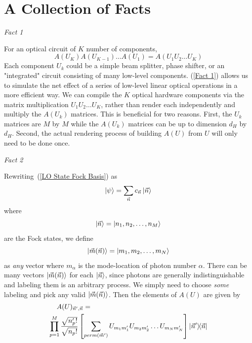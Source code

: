 \documentclass[aps,pra,twocolumn,showpacs,superscriptaddress,floatfix,10pt]{revtex4}
\begin{document}
\section{A Collection of Facts}
\label{Section of Facts}
\begin{center}\textit{Fact 1} \end{center}
For an optical circuit of $K$ number of components,
\begin{equation}
	\label{Fact 1}
\boxed{A(U_K) A(U_{K-1}) \dots A(U_1) = A(U_1 U_2 \dots U_K)}
\end{equation}
Each component $U_k$ could be a simple beam splitter, phase shifter, or an "integrated" circuit consisting of many low-level components.
(\ref{Fact 1}) allows us to simulate the net effect of a series of low-level linear optical operations  in a more efficient way. We can compile the $K$ optical hardware components via the matrix multiplication $U_1 U_2 \dots U_K$, rather than render each independently and multiply the $A(U_k)$ matrices. This is beneficial for two reasons. First, the $U_k$ matrices are $M$ by $M$ while the $A(U_k)$ matrices can be up to dimension $d_H$ by $d_H$. Second, the actual rendering process of building $A(U)$ from $U$ will only need to be done once.
\begin{center}\textit{Fact 2} \end{center}
Rewriting~(\ref{LO State Fock Basis}) as
\begin{equation}
\label{LO State Fock Vec Basis}
\ket{\psi} = \sum_{\vec{n}} c_{\vec{n}} \ket{\vec{n}}
\end{equation}
where
\begin{equation}
\ket{\vec{n}} = \ket{n_1,n_2,\dots,n_M}
\end{equation}
are the Fock states, we define
\begin{equation}
\label{m definition}
\ket{\vec{m}(\vec{n})} = \ket{m_1,m_2,\dots,m_N}
\end{equation}
as \textit{any} vector where $m_\alpha$ is the mode-location of photon number $\alpha$. There can be many vectors $\ket{\vec{m}(\vec{n})}$ for each $\ket{\vec{n}}$, since photons are generally indistinguishable and labeling them is an arbitrary process. We simply need to choose \textit{some} labeling and pick any valid $\ket{\vec{m}(\vec{n})}$. Then the elements of $A(U)$ are given by
\begin{eqnarray}
\label{Fact 2}
A(U)_{\vec{n}^\prime,\vec{n}} = \quad \quad \quad \quad \quad \quad \quad \quad \quad \quad \quad \quad \quad \quad \quad \quad \quad \\ \small \nonumber \prod_{p=1}^{M} \frac{\sqrt{n_p^\prime !}}{\sqrt{n_p !}} \left[\sum_{perm(\vec{m}^\prime)} U_{m_1 m_1^\prime} U_{m_2 m_2^\prime} \dots U_{m_N m_N^\prime} \right] \outerproduct{\vec{n}^\prime}{\vec{n}} 
\end{eqnarray}
\end{document}
